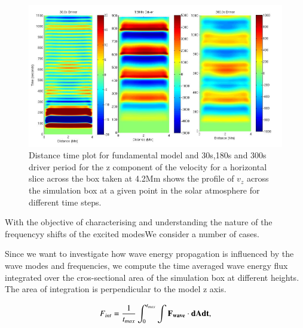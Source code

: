\documentclass[final,1p]{elsarticle}
\begin{document}

\begin{figure}[h]\label{fig9_dt_30_180_300_0_horiz_4p2Mm}
\includegraphics[scale=0.4]{images/fig7_dt_30_180_300_0_horiz_4p2Mm.jpg}
\caption{Distance time plot for fundamental model and 30s,180s and 300s driver period for the z component of the velocity for a horizontal slice across the box  taken at 4.2Mm shows  the profile of $v_{z}$ across the simulation box at a given point in the solar atmosphere for different time steps. }
\end{figure}




















With the objective of characterising and understanding the nature of the frequencyy shifts of the excited modesWe consider a number of cases.

Since we want to investigate how wave energy propagation is influenced by the wave modes and frequencies, we compute the time averaged wave energy flux integrated over the cros-sectional area of the simulation box at different heights. The area of integration is perpendicular to the model z axis.

\begin{equation}\label{eqwaveenergyfluxintegral}
F_{int}= \frac{1}{t_{max}} \int_{0}^{t_{max}} \int         \bf{F_{wave}} \cdot d\bf{A}   dt   ,
\end{equation}
\end{document}
